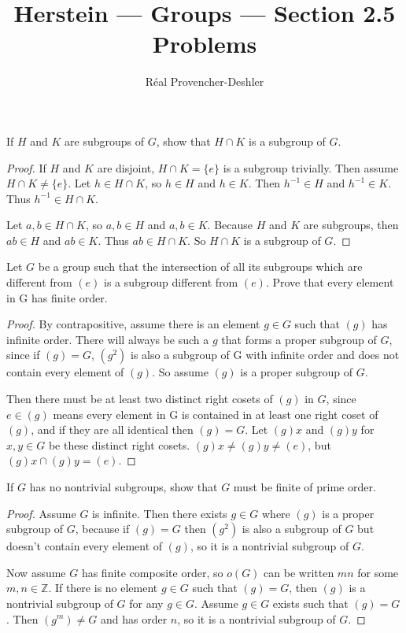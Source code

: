 \documentclass[a4paper]{article}
\newenvironment{problem}[2][Problem]{\begin{trivlist}
\item[\hskip \labelsep {\bfseries #1}\hskip \labelsep {\bfseries #2.}]}{\end{trivlist}}
\begin{document}
\title{Herstein --- Groups --- Section 2.5 Problems}
\author{Réal Provencher-Deshler}
\maketitle

\begin{problem}{1}
  If $H$ and $K$ are subgroups of $G$, show that $H \cap K$ is a subgroup of $G$.
\end{problem}

\begin{proof}
  If $H$ and $K$ are disjoint, $H \cap K = \{e\}$ is a subgroup trivially. Then assume $H \cap K
  \neq \{e\}$. Let $h \in H \cap K$, so $h \in H$ and $h \in K$. Then $h^{-1} \in H$ and $h^{-1}
  \in K$. Thus $h^{-1} \in H \cap K$.

Let $a, b \in H \cap K$, so $a, b \in H$ and $a, b \in K$. Because $H$ and $K$ are subgroups, then
$ab \in H$ and $ab \in K$. Thus $ab \in H \cap K$. So $H \cap K$ is a subgroup of $G$.
\end{proof}


\begin{problem}{2}
  Let $G$ be a group such that the intersection of all its subgroups which are different from $(e)$
  is a subgroup different from $(e)$. Prove that every element in G has finite order.
\end{problem}

\begin{proof}
  By contrapositive, assume there is an element $g \in G$ such that $(g)$ has infinite order. There
  will always be such a $g$ that forms a proper subgroup of $G$, since if $(g) = G$, $(g^2)$ is also
  a subgroup of G with infinite order and does not contain every element of $(g)$. So assume $(g)$
  is a proper subgroup of $G$.

  Then there must be at least two distinct right cosets of $(g)$ in $G$, since $e \in (g)$ means
  every element in G is contained in at least one right coset of $(g)$, and if they are all
  identical then $(g) = G$. Let $(g)x$ and $(g)y$ for $x,y \in G$ be these distinct right cosets.
  $(g)x \neq (g)y \neq (e)$, but $(g)x \cap (g)y = (e)$.
\end{proof}


\begin{problem}{3}
  If $G$ has no nontrivial subgroups, show that $G$ must be finite of prime order.
\end{problem}

\begin{proof}
  Assume $G$ is infinite. Then there exists $g \in G$ where $(g)$ is a proper subgroup of $G$,
  because if $(g) = G$ then $(g^2)$ is also a subgroup of $G$ but doesn't contain every element of
  $(g)$, so it is a nontrivial subgroup of $G$.

  Now assume $G$ has finite composite order, so $o(G)$ can be written $mn$ for some $m,n \in
  \mathbb{Z}$. If there is no element $g \in G$ such that $(g) = G$, then $(g)$ is a nontrivial
  subgroup of $G$ for any $g \in G$. Assume $g \in G$ exists such that $(g) = G$. Then $(g^m) \neq G$ and has order
  $n$, so it is a nontrivial subgroup of $G$.
\end{proof}
\end{document}
